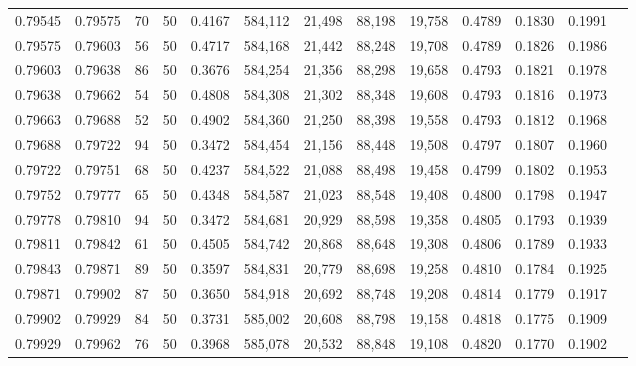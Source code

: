 \begin{tabular}{rrrrrrrrrrrrr}
0.79545 & 0.79575 &    70 &  50 &                                     0.4167 & 584,112 &  21,498 &  88,198 &  19,758 & 0.4789 & 0.1830 & 0.1991 \\
0.79575 & 0.79603 &    56 &  50 &                                     0.4717 & 584,168 &  21,442 &  88,248 &  19,708 & 0.4789 & 0.1826 & 0.1986 \\
0.79603 & 0.79638 &    86 &  50 &                                     0.3676 & 584,254 &  21,356 &  88,298 &  19,658 & 0.4793 & 0.1821 & 0.1978 \\
0.79638 & 0.79662 &    54 &  50 &                                     0.4808 & 584,308 &  21,302 &  88,348 &  19,608 & 0.4793 & 0.1816 & 0.1973 \\
0.79663 & 0.79688 &    52 &  50 &                                     0.4902 & 584,360 &  21,250 &  88,398 &  19,558 & 0.4793 & 0.1812 & 0.1968 \\
0.79688 & 0.79722 &    94 &  50 &                                     0.3472 & 584,454 &  21,156 &  88,448 &  19,508 & 0.4797 & 0.1807 & 0.1960 \\
0.79722 & 0.79751 &    68 &  50 &                                     0.4237 & 584,522 &  21,088 &  88,498 &  19,458 & 0.4799 & 0.1802 & 0.1953 \\
0.79752 & 0.79777 &    65 &  50 &                                     0.4348 & 584,587 &  21,023 &  88,548 &  19,408 & 0.4800 & 0.1798 & 0.1947 \\
0.79778 & 0.79810 &    94 &  50 &                                     0.3472 & 584,681 &  20,929 &  88,598 &  19,358 & 0.4805 & 0.1793 & 0.1939 \\
0.79811 & 0.79842 &    61 &  50 &                                     0.4505 & 584,742 &  20,868 &  88,648 &  19,308 & 0.4806 & 0.1789 & 0.1933 \\
0.79843 & 0.79871 &    89 &  50 &                                     0.3597 & 584,831 &  20,779 &  88,698 &  19,258 & 0.4810 & 0.1784 & 0.1925 \\
0.79871 & 0.79902 &    87 &  50 &                                     0.3650 & 584,918 &  20,692 &  88,748 &  19,208 & 0.4814 & 0.1779 & 0.1917 \\
0.79902 & 0.79929 &    84 &  50 &                                     0.3731 & 585,002 &  20,608 &  88,798 &  19,158 & 0.4818 & 0.1775 & 0.1909 \\
0.79929 & 0.79962 &    76 &  50 &                                     0.3968 & 585,078 &  20,532 &  88,848 &  19,108 & 0.4820 & 0.1770 & 0.1902 \\

\end{tabular}
